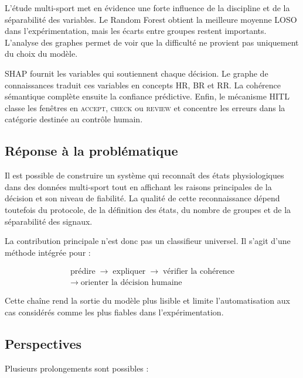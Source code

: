 \documentclass[12pt,a4paper]{article}
\begin{document}
L'étude multi-sport met en évidence une forte influence de la discipline et de
la séparabilité des variables. Le Random Forest obtient la meilleure moyenne
LOSO dans l'expérimentation, mais les écarts entre groupes restent importants.
L'analyse des graphes permet de voir que la difficulté ne provient pas
uniquement du choix du modèle.

SHAP fournit les variables qui soutiennent chaque décision. Le graphe de
connaissances traduit ces variables en concepts HR, BR et RR. La cohérence
sémantique complète ensuite la confiance prédictive. Enfin, le mécanisme HITL
classe les fenêtres en \textsc{accept}, \textsc{check} ou \textsc{review} et
concentre les erreurs dans la catégorie destinée au contrôle humain.

\subsection{Réponse à la problématique}

Il est possible de construire un système qui reconnaît des états
physiologiques dans des données multi-sport tout en affichant les raisons
principales de la décision et son niveau de fiabilité. La qualité de cette
reconnaissance dépend toutefois du protocole, de la définition des états, du
nombre de groupes et de la séparabilité des signaux.

La contribution principale n'est donc pas un classifieur universel. Il s'agit
d'une méthode intégrée pour :

\[
\boxed{
\begin{gathered}
\text{prédire}
\;\longrightarrow\;
\text{expliquer}
\;\longrightarrow\;
\text{vérifier la cohérence}\\[0.15cm]
\longrightarrow\;
\text{orienter la décision humaine}
\end{gathered}
}
\]

Cette chaîne rend la sortie du modèle plus lisible et limite l'automatisation
aux cas considérés comme les plus fiables dans l'expérimentation.

\subsection{Perspectives}

Plusieurs prolongements sont possibles :
\end{document}
